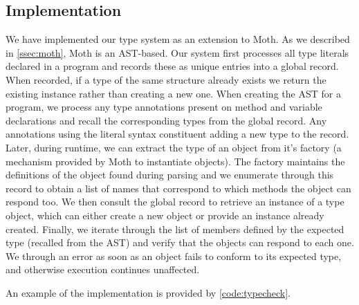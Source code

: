 

\subsection{Implementation}
\label{sec:implementation}

We have implemented our type system as an extension to Moth.
As we described in \cref{ssec:moth},
Moth is an AST-based.
Our system first processes all type literals declared in a program and records these as
unique entries into a global record.
When recorded, if a type of the same structure already exists we return the existing instance
rather than creating a new one.
When creating the AST for a program, 
we process any type annotations present on method and variable declarations and
recall the corresponding types from the global record. 
Any annotations using the literal syntax constituent adding a new type to the record.
Later, during runtime, we can extract the type of an object from it's factory 
(a mechanism provided by Moth to instantiate objects).
The factory maintains the definitions of the object found during parsing and
we enumerate through this record to obtain a list of names that correspond
to which methods the object can respond too.
We then consult the global record to retrieve an instance of a type object,
which can either create a new object or provide an instance already created.
Finally, we iterate through the list of members defined by the expected type 
(recalled from the AST) and verify that the objects can respond to each one.
We through an error as soon as an object fails to conform to its expected type, 
and otherwise execution continues unaffected. 

An example of the implementation is provided by \cref{code:typecheck}.









